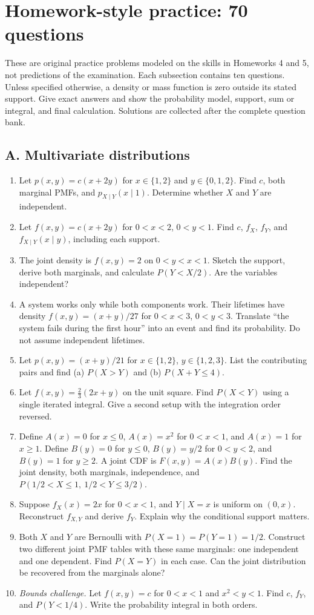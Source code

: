 \clearpage
\section{Homework-style practice: 70 questions}
These are original practice problems modeled on the skills in Homeworks 4 and 5, not predictions of the examination. Each subsection contains ten questions. Unless specified otherwise, a density or mass function is zero outside its stated support. Give exact answers and show the probability model, support, sum or integral, and final calculation. Solutions are collected after the complete question bank.

\subsection{A. Multivariate distributions}
\begin{enumerate}[label=\textbf{A\arabic*.},leftmargin=*,itemsep=0.75em]
\item Let $p(x,y)=c(x+2y)$ for $x\in\{1,2\}$ and $y\in\{0,1,2\}$. Find $c$, both marginal PMFs, and $p_{X\mid Y}(x\mid1)$. Determine whether $X$ and $Y$ are independent.
\item Let $f(x,y)=c(x+2y)$ for $0<x<2$, $0<y<1$. Find $c$, $f_X$, $f_Y$, and $f_{X\mid Y}(x\mid y)$, including each support.
\item The joint density is $f(x,y)=2$ on $0<y<x<1$. Sketch the support, derive both marginals, and calculate $P(Y<X/2)$. Are the variables independent?
\item A system works only while both components work. Their lifetimes have density $f(x,y)=(x+y)/27$ for $0<x<3$, $0<y<3$. Translate ``the system fails during the first hour'' into an event and find its probability. Do not assume independent lifetimes.
\item Let $p(x,y)=(x+y)/21$ for $x\in\{1,2\}$, $y\in\{1,2,3\}$. List the contributing pairs and find (a) $P(X>Y)$ and (b) $P(X+Y\leq4)$.
\item Let $f(x,y)=\frac23(2x+y)$ on the unit square. Find $P(X<Y)$ using a single iterated integral. Give a second setup with the integration order reversed.
\item Define $A(x)=0$ for $x\leq0$, $A(x)=x^2$ for $0<x<1$, and $A(x)=1$ for $x\geq1$. Define $B(y)=0$ for $y\leq0$, $B(y)=y/2$ for $0<y<2$, and $B(y)=1$ for $y\geq2$. A joint CDF is $F(x,y)=A(x)B(y)$. Find the joint density, both marginals, independence, and $P(1/2<X\leq1,\ 1/2<Y\leq3/2)$.
\item Suppose $f_X(x)=2x$ for $0<x<1$, and $Y\mid X=x$ is uniform on $(0,x)$. Reconstruct $f_{X,Y}$ and derive $f_Y$. Explain why the conditional support matters.
\item Both $X$ and $Y$ are Bernoulli with $P(X=1)=P(Y=1)=1/2$. Construct two different joint PMF tables with these same marginals: one independent and one dependent. Find $P(X=Y)$ in each case. Can the joint distribution be recovered from the marginals alone?
\item \textit{Bounds challenge.} Let $f(x,y)=c$ for $0<x<1$ and $x^2<y<1$. Find $c$, $f_Y$, and $P(Y<1/4)$. Write the probability integral in both orders.
\end{enumerate}

